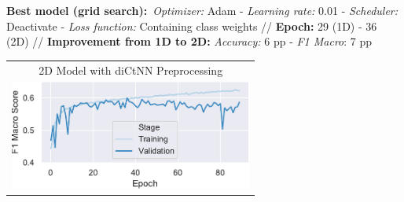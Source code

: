 \documentclass[a0paper,landscape]{baposter}
\begin{document}
\begin{poster}
{    %
\textbf{Best model (grid search):}\
\textit{Optimizer:} Adam - \textit{Learning rate:} 0.01 - \textit{Scheduler:} Deactivate - \textit{Loss function:} Containing class weights // \textbf{Epoch:} 29 (1D) - 36 (2D) // \textbf{Improvement from 1D to 2D:} \textit{Accuracy:} 6 pp - \textit{F1 Macro}: 7 pp 
\begin{center}
    \begin{tabular}{c}
    2D Model with diCtNN Preprocessing \\
    \includegraphics[width=8cm, keepaspectratio]{figures/f1_diCtNN_Model_27_90epochs_wp.pdf}
    \end{tabular}
\end{center}
}

\end{poster}
\end{document}
